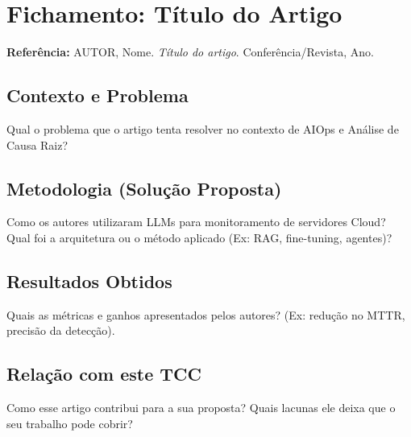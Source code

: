 
\section*{Fichamento: Título do Artigo}
\label{sec:resumo_artigo_1}

\noindent\textbf{Referência:} AUTOR, Nome. \textit{Título do artigo}. Conferência/Revista, Ano.

\subsection*{Contexto e Problema}
Qual o problema que o artigo tenta resolver no contexto de AIOps e Análise de Causa Raiz?

\subsection*{Metodologia (Solução Proposta)}
Como os autores utilizaram LLMs para monitoramento de servidores Cloud? Qual foi a arquitetura ou o método aplicado (Ex: RAG, fine-tuning, agentes)?

\subsection*{Resultados Obtidos}
Quais as métricas e ganhos apresentados pelos autores? (Ex: redução no MTTR, precisão da detecção).

\subsection*{Relação com este TCC}
Como esse artigo contribui para a sua proposta? Quais lacunas ele deixa que o seu trabalho pode cobrir?
